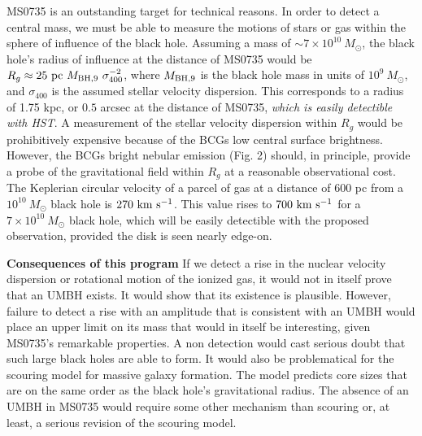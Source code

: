 \documentclass[12pt]{article}
\begin{document}
MS0735 is an outstanding target for technical reasons.  In order to detect a central mass, we must be able to measure the motions of stars or gas within the sphere of influence of the black hole.  Assuming a mass of $\sim 7\times 10^{10}~ M_\odot$, the
black hole's  radius of influence at the distance of MS0735 would be
$R_g\approx 25~{\rm pc}~M_{\rm BH,9}~\sigma_{400}^{-2}$, where $M_{\rm BH,9}$ is the black hole mass in units of $10^9~M_{\odot}$, and $ \sigma_{400}$ is the assumed stellar velocity dispersion.
 This corresponds to a radius of 1.75 kpc, or $0.5$ arcsec at the distance of MS0735, {\it which is easily detectible with HST}. 
A measurement of the stellar velocity dispersion within $R_g$ would be prohibitively expensive because of the BCGs low central surface brightness.  However, the BCGs bright nebular emission (Fig. 2) should, in principle, provide a probe of the gravitational field within $R_g$ at a reasonable observational cost. 
The Keplerian circular velocity of a parcel of gas at a distance of 600 pc from a $10^{10} ~ M_\odot$ black hole is $270 
~ \rm km~s^{-1}$.  This value rises
to $700 ~\rm km~s^{-1}$ for a $7\times 10^{10}~ M_\odot$ black hole, which will be easily detectible with the proposed observation,
provided the disk is seen nearly edge-on.

{\bf Consequences of this program} If we detect a rise in the nuclear velocity dispersion or rotational motion of the ionized gas, it would not in itself prove that an UMBH exists.
It would show that its existence is plausible.  However, failure to detect a 
rise with an amplitude that is consistent with an UMBH would place an upper limit on its mass that would in itself be interesting,
given MS0735's remarkable properties.  A non detection would cast serious doubt that such large black holes
are able to form.   It would also be problematical for the scouring model for massive galaxy formation.  The model predicts
core sizes that are on the same order as the black hole's gravitational radius.  The absence of an UMBH in MS0735 would require some other mechanism than scouring or, at least, a serious revision of the scouring model. 
\end{document}
